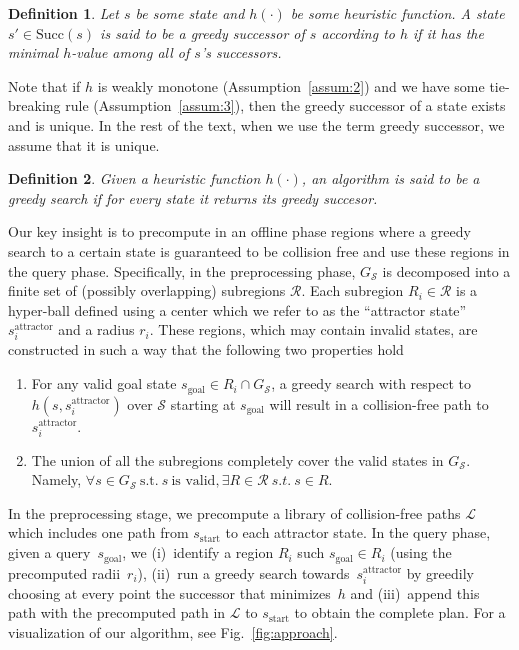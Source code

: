 \documentclass[letterpaper]{article} %
\newcommand{\calL}{\ensuremath{\mathcal{L}}\xspace}
\newcommand{\calS}{\ensuremath{\mathcal{S}}\xspace}
\newcommand{\calR}{\ensuremath{\mathcal{R}}\xspace}
\newcommand{\sAttract}{\ensuremath{s^{\text{attractor}}_i}\xspace}
\newcommand{\sStart}{\ensuremath{s_{\text{start}}\xspace}}
\newcommand{\sGoal}{\ensuremath{s_{\text{goal}}\xspace}}
\newtheorem{definition}{Definition}
\begin{document}
\vspace{2mm}
\begin{definition}
	Let $s$ be some state and $h(\cdot)$ be some heuristic function.
	A state $s' \in \text{Succ}(s)$ is said to be a \emph{greedy} successor of $s$ according to $h$ if it has the minimal $h$-value among all of $s$'s successors.
\end{definition}
Note that 
if $h$ is weakly monotone 
(Assumption~\ref{assum:2}) 
and we have some tie-breaking rule
(Assumption~\ref{assum:3}), then the greedy successor of a state exists and is unique.  
In the rest of the text, when we use the term greedy successor, we assume that it is unique.

\vspace{2mm}
\begin{definition}
	Given a heuristic function $h(\cdot)$,
	an algorithm is said to be a \emph{greedy search} if for every state it returns its greedy succesor.
\end{definition}

Our key insight is to precompute in an offline phase regions where a greedy search to a certain state is guaranteed to be collision free and use these regions in the query phase.
Specifically, in the preprocessing phase, $G_\calS$ is decomposed into a finite  set of (possibly overlapping) subregions $\calR$.
Each subregion $R_i \in \calR$ is a hyper-ball defined using a center which we refer to as the ``attractor state''~
\sAttract and a radius $r_i$.
These regions, which may contain invalid states, are constructed in such a way that the following two properties hold
\begin{enumerate}[label={\textbf{P\arabic*}}]
  \item \label{property:1} For any valid goal state $s_{\text{goal}} \in R_i \cap G_\calS$, a greedy search with respect to $h(s, \sAttract)$ over $\calS$ starting at $\sGoal$ will result in a collision-free path to \sAttract.
  \item \label{property:2} The union of all the subregions completely cover the valid states in $G_\calS$. 
		  Namely, $\forall s \in G_\calS~\text{s.t.}~s~\text{is valid}, \exists R \in \calR \ s.t. \ s \in R$.
\end{enumerate}

In the preprocessing stage, we precompute a library of collision-free paths $\calL$ which includes one path from $\sStart$ to each attractor state. 
In the query phase, given a query~\sGoal, we 
(i)~identify a region $R_i$ such $\sGoal \in R_i$ (using the precomputed radii~$r_i$),
(ii)~run a greedy search towards~\sAttract by greedily choosing at every point the successor that minimizes~$h$ and
(iii)~append this path with the precomputed path in $\calL$ to $\sStart$ to obtain the complete plan.
For a visualization of our algorithm, see Fig.~\ref{fig:approach}.
\end{document}
